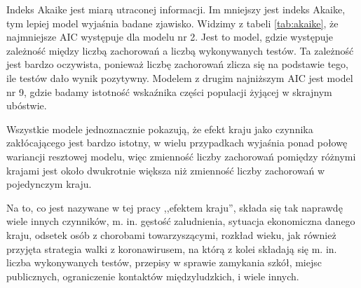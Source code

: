 \documentclass[12pt]{mwbk}
\theoremstyle{plain}
\theoremstyle{definition}
\theoremstyle{remark}
\begin{document}
Indeks Akaike jest miarą utraconej informacji. Im mniejszy jest indeks Akaike, tym lepiej model wyjaśnia badane zjawisko. Widzimy z tabeli \ref{tab:akaike}, że najmniejsze AIC występuje dla modelu nr 2. Jest to model, gdzie występuje zależność między liczbą zachorowań a liczbą wykonywanych testów. Ta zależność jest bardzo oczywista, ponieważ liczbę zachorowań zlicza się na podstawie tego, ile testów dało wynik pozytywny. Modelem z drugim najniższym AIC jest model nr 9, gdzie badamy istotność wskaźnika części populacji żyjącej w skrajnym ubóstwie.



Wszystkie modele jednoznacznie pokazują, że efekt kraju jako czynnika zakłócającego jest bardzo istotny, w wielu przypadkach wyjaśnia ponad połowę wariancji resztowej modelu, więc zmienność liczby zachorowań pomiędzy różnymi krajami jest około dwukrotnie większa niż zmienność liczby zachorowań w pojedynczym kraju.

Na to, co jest nazywane w tej pracy ,,efektem kraju'', składa się tak naprawdę wiele innych czynników, m. in. gęstość zaludnienia, sytuacja ekonomiczna danego kraju, odsetek osób z chorobami towarzyszącymi, rozkład wieku, jak również przyjęta strategia walki z koronawirusem, na którą z kolei składają się m. in. liczba wykonywanych testów, przepisy w sprawie zamykania szkół, miejsc publicznych, ograniczenie kontaktów międzyludzkich, i wiele innych.
\end{document}
